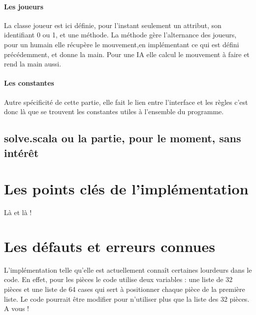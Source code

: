 \documentclass[a4paper]{article}
\begin{document}
\paragraph{Les joueurs} La classe joueur est ici définie, pour l'instant seulement un attribut, son identifiant 0 ou 1, et une méthode. La méthode gère l'alternance des joueurs, pour un humain elle récupère le mouvement,en implémentant ce qui est défini précédemment, et donne la main. Pour une IA elle calcul le mouvement à faire et rend la main aussi.

\paragraph{Les constantes} Autre spécificité de cette partie, elle fait le lien entre l'interface et les règles c'est donc là que se trouvent les constantes utiles à l'ensemble du programme.

\subsection{solve.scala ou la partie, pour le moment, sans intérêt}

\section{Les points clés de l'implémentation}

Là et là !

\section{Les défauts et erreurs connues}

L'implémentation telle qu'elle est actuellement connaît certaines lourdeurs dans le code. En effet, pour les pièces le code utilise deux variables : une liste de 32 pièces et une liste de 64 cases qui sert à positionner chaque pièce de la première liste. Le code pourrait être modifier pour n'utiliser plus que la liste des 32 pièces. \\

A vous !
\end{document}
